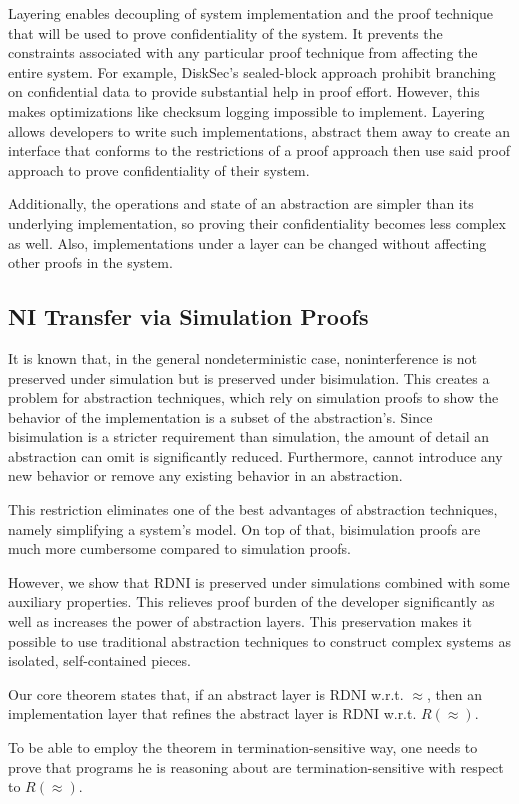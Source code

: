 Layering enables decoupling of system implementation and the proof technique that will be used to prove confidentiality of the system. It prevents the constraints associated with any particular proof technique from affecting the  entire system. For example, DiskSec's sealed-block approach prohibit branching on confidential data to provide substantial help in proof effort. However, this makes optimizations like checksum logging impossible to implement. Layering allows developers to write such implementations, abstract them away to create an interface that conforms to the restrictions of a proof approach then use said proof approach to prove confidentiality of their system.

Additionally, the operations and state of an abstraction are simpler than its underlying implementation, so proving their confidentiality becomes less complex as well. Also, implementations under a layer can be changed without affecting other proofs in the system.

\subsection{NI Transfer via Simulation Proofs}
It is known that, in the general nondeterministic case, noninterference is not preserved under simulation but is preserved under bisimulation. This creates a problem for abstraction techniques, which rely on simulation proofs to show the behavior of the implementation is a subset of the abstraction's. Since bisimulation is a stricter requirement than simulation, the amount of detail an abstraction can omit is significantly reduced. Furthermore, cannot introduce any new behavior or remove any existing behavior in an abstraction.

This restriction eliminates one of the best advantages of abstraction techniques, namely simplifying a system's model. On top of that, bisimulation proofs are much more cumbersome compared to simulation proofs. 

However, we show that RDNI is preserved under simulations combined with some auxiliary properties. This relieves proof burden of the developer significantly as well as increases the power of abstraction layers. This preservation makes it possible to use traditional abstraction techniques to construct complex systems as isolated, self-contained pieces.

Our core theorem states that, if an abstract layer is RDNI w.r.t. $\approx$, then an implementation layer that refines the abstract layer is RDNI w.r.t. $R(\approx)$.  

To be able to employ the theorem in termination-sensitive way, one needs to prove that programs he is reasoning about are termination-sensitive with respect to $R(\approx)$.